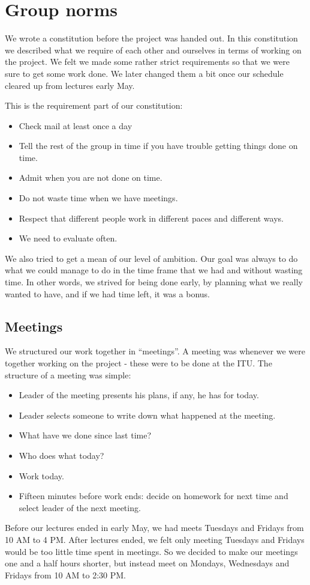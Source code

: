 \chapter{Group norms}
We wrote a constitution before the project was handed out. In this
constitution we described what we require of each other and ourselves in terms of
working on the project. We felt we made some rather strict requirements so that
we were sure to get some work done. We later changed
them a bit once our schedule cleared up from lectures early May.

This is the requirement part of our constitution:
\begin{itemize}
  \item Check mail at least once a day
  \item Tell the rest of the group in time if you have trouble getting things done on
  time.
  \item Admit when you are not done on time.
  \item Do not waste time when we have meetings.
  \item Respect that different people work in different paces and different
  ways.
  \item We need to evaluate often.
\end{itemize}

We also tried to get a mean of our level of ambition. Our goal was always to do
what we could manage to do in the time frame that we had and without wasting
time. In other words, we strived for being done early, by planning what we really 
wanted to have, and if we had time left, it was a bonus.

\section{Meetings}
\label{GN-M}
We structured our work together in ``meetings''. A meeting was whenever we were
together working on the project - these were to be done at the ITU. The
structure of a meeting was simple:
\begin{itemize}
  \item Leader of the meeting presents his plans, if any, he has for today. 
  \item Leader selects someone to write down what happened at the meeting.
  \item What have we done since last time?
  \item Who does what today?
  \item Work today.
  \item Fifteen minutes before work ends: decide on homework for next time and
  select leader of the next meeting.
\end{itemize}
Before our lectures ended in early May, we had meets Tuesdays and Fridays from
10 AM to 4 PM. After lectures ended, we felt only meeting Tuesdays and Fridays
would be too little time spent in meetings. So we decided to make our meetings
one and a half hours shorter, but instead meet on Mondays, Wednesdays and
Fridays from 10 AM to 2:30 PM.
